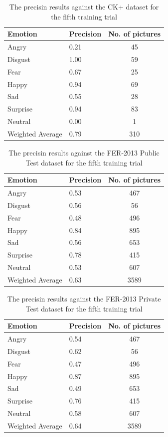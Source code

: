 \documentclass[runningheads,a4paper,11pt]{report}
\begin{document}
\begin{table}[htbp]
	\caption{The precisin results against the CK+ dataset for the fifth training trial}
	\label{fer_training_28k_01_mean_square_ckp}
		\begin{center}
			\begin{tabular}{p{110pt}p{110pt}c}
				\textbf{Emotion}& \textbf{Precision}& \textbf{No. of pictures} \\
				\hline\hline
				Angry& 0.21& 45 \\
				Disgust& 1.00& 59 \\
				Fear& 0.67& 25 \\
				Happy& 0.94& 69 \\
				Sad& 0.55& 28 \\
				Surprise& 0.94& 83 \\
				Neutral& 0.00& 1 \\
				\hline
				Weighted Average& 0.79& 310
			\end{tabular}
		\end{center}
\end{table}
\begin{table}[htbp]
	\caption{The precisin results against the FER-2013 Public Test dataset for the fifth training trial}
	\label{fer_training_28k_01_mean_square_public_test}
		\begin{center}
			\begin{tabular}{p{110pt}p{110pt}c}
				\textbf{Emotion}& \textbf{Precision}& \textbf{No. of pictures} \\
				\hline\hline
				Angry& 0.53& 467 \\
				Disgust& 0.56& 56 \\
				Fear& 0.48& 496 \\
				Happy& 0.84& 895 \\
				Sad& 0.56& 653 \\
				Surprise& 0.78& 415 \\
				Neutral& 0.53& 607 \\
				\hline
				Weighted Average& 0.63 &3589
			\end{tabular}
		\end{center}
\end{table}
\begin{table}[htbp]
	\caption{The precisin results against the FER-2013 Private Test dataset for the fifth training trial}
	\label{fer_training_28k_01_mean_square_private_test}
		\begin{center}
			\begin{tabular}{p{110pt}p{110pt}c}
				\textbf{Emotion}& \textbf{Precision}& \textbf{No. of pictures} \\
				\hline\hline
				Angry& 0.54& 467 \\
				Disgust& 0.62& 56 \\
				Fear& 0.47& 496 \\
				Happy& 0.87& 895 \\
				Sad& 0.49& 653 \\
				Surprise& 0.76& 415 \\
				Neutral& 0.58& 607 \\
				\hline
				Weighted Average& 0.64 &3589
			\end{tabular}
		\end{center}
\end{table}
\end{document}
